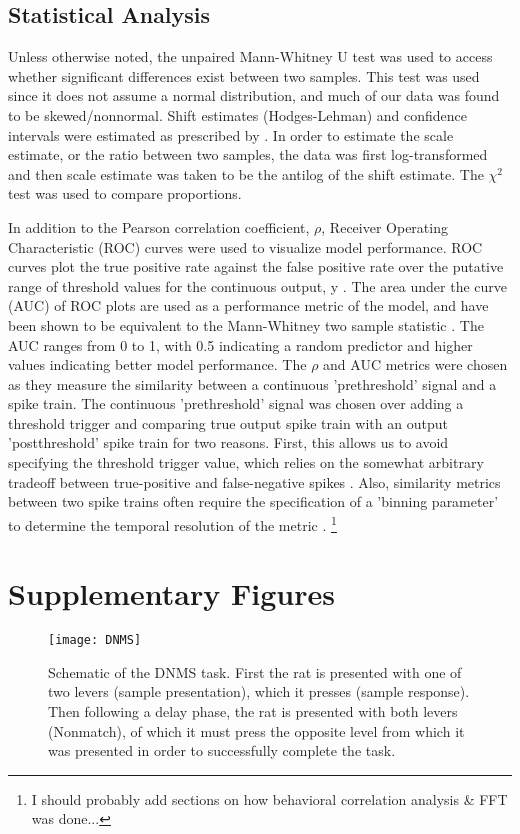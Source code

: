 \documentclass[11pt,a4paper,final]{article}
\begin{document}
    \subsection{Statistical Analysis}
Unless otherwise noted, the unpaired Mann-Whitney U test was used to access whether significant differences exist between two samples. This test was used since it does not assume a normal distribution, and much of our data was found to be skewed/nonnormal. Shift estimates (Hodges-Lehman) and confidence intervals were estimated as prescribed by \citet{higgins93}. In order to estimate the scale estimate, or the ratio between two samples, the data was first log-transformed and then scale estimate was taken to be the antilog of the shift estimate. The $\chi^2$ test was used to compare proportions.

In addition to the Pearson correlation coefficient, $\rho$, Receiver Operating Characteristic (ROC) curves were used to visualize model performance. ROC curves plot the true positive rate against the false positive rate over the putative range of threshold values for the continuous output, y \citep{zanos08}. The area under the curve (AUC) of ROC plots are used as a performance metric of the model, and have been shown to be equivalent to the Mann-Whitney two sample statistic \citep{hanely1982}. The AUC ranges from 0 to 1, with 0.5 indicating a random predictor and higher values indicating better model performance. The $\rho$ and AUC metrics were chosen as they measure the similarity between a continuous 'prethreshold' signal and a spike train. The continuous 'prethreshold' signal was chosen over adding a threshold trigger and comparing true output spike train with an output 'postthreshold' spike train for two reasons. First, this allows us to avoid specifying the threshold trigger value, which relies on the somewhat arbitrary tradeoff between true-positive and false-negative spikes \citep{marm13}. Also, similarity metrics between two spike trains often require the specification of a 'binning parameter' to determine the temporal resolution of the metric \citep{vanrossum01,victor97}.
\footnote{I should probably add sections on how behavioral correlation analysis \& FFT was done...}


\section{Supplementary Figures \label{SF}}

\begin{figure}[!ht]
\centering
\texttt{[image: DNMS]}
\caption[DNMS Task Schematic]{
Schematic of the DNMS task. First the rat is presented with one of two levers (sample presentation), which it presses (sample response). Then following a delay phase, the rat is presented with both levers (Nonmatch), of which it must press the opposite level from which it was presented in order to successfully complete the task. }
\label{DNMS}
\end{figure}
\end{document}
